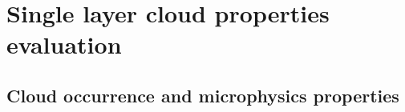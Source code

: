 \documentclass[journal abbreviation, manuscript]{copernicus}
\begin{document}


\section{Single layer cloud properties evaluation}\label{sec:clod_prop_eval}

\subsection{Cloud occurrence and microphysics properties}
\end{document}

